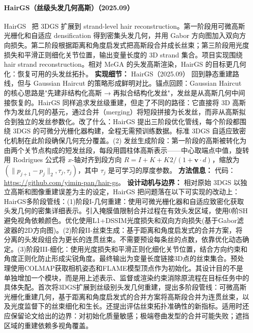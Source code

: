 \paragraph{HairGS（丝级头发几何高斯）（2025.09）}
HairGS~\cite{2509_07774} 把 3DGS 扩展到 strand-level hair reconstruction。第一阶段用可微高斯光栅化和自适应 densification 得到密集头发几何，并用 Gabor 方向图加入双向方向损失。第二阶段根据距离和角度启发式把高斯段合并成长丝束；第三阶段用光度损失和平滑正则细化关节位置，输出变量长度的 3D strand 集合。项目实现围绕 hair strand reconstruction。相对 MeGA 的头发高斯渲染，HairGS 的目标更几何化：恢复可用的头发丝拓扑。
\textbf{实现细节：} HairGS（2025.09） 回到静态重建路线，但与 Gaussian Haircut 的策略形成鲜明对比。锚点回顾：Gaussian Haircut 的核心思路是"先建非结构化高斯 → 再拟合结构化发丝"，发丝是从高斯几何中间接恢复的。HairGS 同样追求发丝级重建，但走了不同的路径：它直接将 3D 高斯作为发丝几何的基元，通过合并（merging）将短段拼接为长发丝，而非从高斯拟合到独立的发丝参数化。改了什么：HairGS 提出三阶段优化管线，每个阶段都围绕 3DGS 的可微分光栅化器构建，全程无需预训练数据。标准 3DGS 自适应致密化机制在此阶段确保几何充分覆盖。(2) 发丝生成阶段：第一阶段的高斯被转化为由两个关节点构成的短发丝段，每段用圆柱体高斯表示——中心取端点中值，旋转用 Rodrigues 公式将 $x$-轴对齐到段方向 $R = I + K + K^{}2/(1 + \mathbf{v} \cdot d)$，缩放为 $(\|p_{j+1} - p_j\|_2, \tau_j, \tau_j)$，其中 $\tau_j$ 是可学习的厚度参数。
\textbf{方法信息：} 代码：\url{https://github.com/yimin-pan/hair-gs}。
\textbf{设计动机与边界：} 相对原始 3DGS 以独立高斯和图像重建误差为主的设定，HairGS 把问题落在以下可实现的改动上：HairGS多阶段管线：(1)阶段I-几何重建：使用可微光栅化器和自适应致密化获取头发几何的密集详细表示。引入掩膜值限制合并过程在有效头发区域，使用0阶SH避免视角依赖颜色。优化使用L1+DSSIM光度损失和双向方向损失(基于Gabor滤波器的2D方向图)。(2)阶段II-丝束生成：基于距离和角度启发式的合并方案，将分离的头发段组合为更长的连贯丝束。不需要预设每条丝的点数，依靠优化动态确定。(3)阶段III-细化：使用光度损失和平滑正则化细化关节位置，结合方向约束和角度正则化防止形成尖锐角度。最终输出为变量长度链接3D点的丝束集合。预处理使用COLMAP获取相机姿态和FLAME模型顶点作为初始化。其设计目的不是单独增加一个模块，而是用上述表示、监督或渲染约束消除原流程在目标任务中的具体失配。首次将3DGS扩展到丝级别头发几何重建，提出多阶段管线：可微高斯光栅化重建几何，基于距离和角度启发式的合并方案将高斯段合并为连贯丝束，以及光度监督下的丝束细化和生长。还提出评估丝束拓扑准确性的新指标。适用时还应保留论文给出的边界：对初始化质量敏感；极端卷曲发型的合并可能失败；遮挡区域的重建依赖多视角覆盖。
